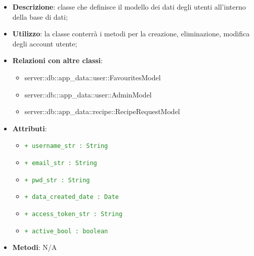 			\begin{itemize}
				\item \textbf{Descrizione}: classe che definisce il modello dei dati degli utenti all'interno della base di dati;
				\item \textbf{Utilizzo}: la classe conterrà i metodi per la creazione, eliminazione, modifica degli account utente;
				\item \textbf{Relazioni con altre classi}:
					\begin{itemize}
						\item server::db::app\_data::user::FavouritesModel
						\item server::db:::app\_data::user::AdminModel
						\item server::db::app\_data::recipe::RecipeRequestModel
					\end{itemize}
				\item \textbf{Attributi}:
					\begin{itemize}
						\item \textcolor{forestgreen}{\texttt{+ username\_str : String}}
						\item \textcolor{forestgreen}{\texttt{+ email\_str : String}}
						\item \textcolor{forestgreen}{\texttt{+ pwd\_str : String}}
						\item \textcolor{forestgreen}{\texttt{+ data\_created\_date : Date}}
						\item \textcolor{forestgreen}{\texttt{+ access\_token\_str : String}}
						\item \textcolor{forestgreen}{\texttt{+ active\_bool : boolean}}
					\end{itemize}
				\item \textbf{Metodi}: N/A
			\end{itemize}


